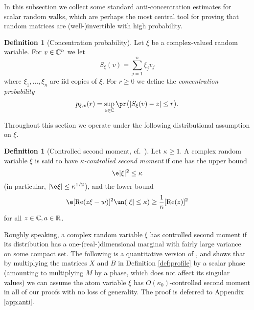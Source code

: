 \documentclass[aop,preprint]{imsart}
\theoremstyle{plain}
\theoremstyle{definition}
\newtheorem{definition}[theorem]{Definition}
\theoremstyle{remark}
\numberwithin{equation}{section}
\numberwithin{theorem}{section}
\def \re {\mathrm{Re}}
\begin{document}
In this subsection we collect some standard anti-concentration estimates for scalar random walks, which are perhaps the most central tool for proving that random matrices are (well-)invertible with high probability. 

\begin{definition}[Concentration probability]
Let $\xi$ be a complex-valued random variable. 
For $v\in {\mathbb C}^n$ we let
\begin{equation}
S_\xi(v) = \sum_{j=1}^n \xi_jv_j
\end{equation}
where $\xi_1,\dots,\xi_n$ are iid copies of $\xi$.
For $r\ge0$ we define the \emph{concentration probability}
\begin{equation}
p_{\xi,v}(r)= \sup_{z\in \C}\pr\big( |S_\xi(v)-z|\le r\big).
\end{equation}
\end{definition}

Throughout this section we operate under the following distributional assumption on $\xi$.

\begin{definition}[Controlled second moment, cf.\ {\cite[Definition 2.2]{TaVu:circ}}]	\label{def:kappa}
Let $\kappa\ge 1$. A complex random variable $\xi$ is said to have \emph{$\kappa$-controlled second moment} if one has the upper bound
\begin{equation}	\label{cond.kappa1}
\e|\xi|^2\le \kappa
\end{equation}
(in particular, $|\e \xi|\le \kappa^{1/2}$), and the lower bound
\begin{equation}	\label{cond.kappa2}
\e [\re(z\xi-w)]^2 \un(|\xi|\le \kappa) \ge \frac1\kappa [\re(z)]^2
\end{equation}
for all $z\in {\mathbb C}, a\in {\mathbb R}$.
\end{definition}

Roughly speaking, a complex random variable $\xi$ has controlled second moment if its distribution has a one-(real-)dimensional marginal with fairly large variance on some compact set.
The following is a quantitative version of \cite[Lemma 2.4]{TaVu:circ}, and shows that by multiplying the matrices $X$ and $B$ in Definition \ref{def:profile} by a scalar phase (amounting to multiplying $M$ by a phase, which does not affect its singular values) we can assume the atom variable $\xi$ has $O(\kappa_0)$-controlled second moment in all of our proofs with no loss of generality.
The proof is 
deferred to Appendix \ref{app:anti}.
\end{document}
